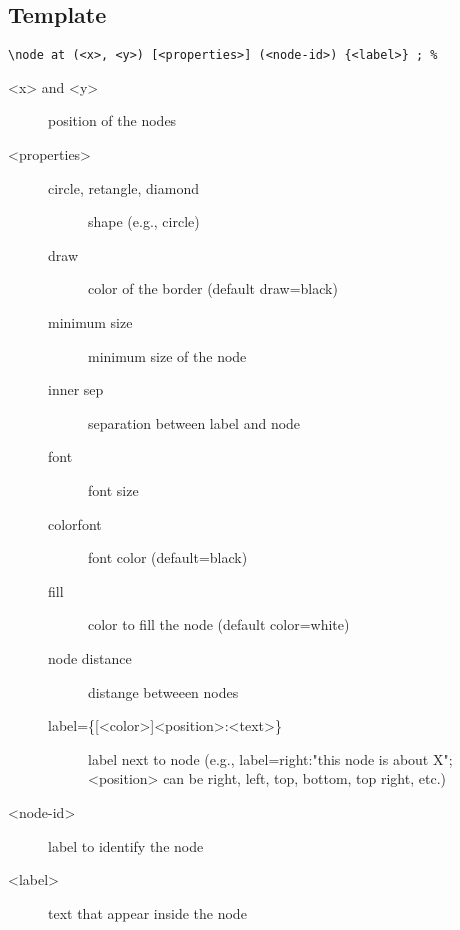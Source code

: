 \documentclass[a4paper]{article}
\begin{document}
\FloatBarrier
\clearpage

\subsection{Template}
\label{sec:org2ffc3e6}

\lstset{numbers=left,language=[LaTeX]TeX,label= ,caption= ,captionpos=b}
\begin{lstlisting}
\node at (<x>, <y>) [<properties>] (<node-id>) {<label>} ; %
\end{lstlisting}

\begin{description}
\item[{\color{red} <x> \color{black} and \color{red} <y> \color{black}}] position of the nodes
\item[{\color{red} <properties> \color{black}}] \begin{description}
\item[{circle, retangle, diamond}] shape (e.g., circle)
\item[{draw         }] color of the border (default draw=black)
\item[{minimum size }] minimum size of the node
\item[{inner sep    }] separation between label and node
\item[{font         }] font size
\item[{colorfont    }] font color (default=black)
\item[{fill         }] color to fill the node (default color=white)
\item[{node distance}] distange betweeen nodes
\item[{label=\{[<color>]<position>:\normalsize<text>\}        }] label next to node (e.g., label=right:"this node is about X"; <position> can be right, left, top, bottom, top right, etc.)
\end{description}
\item[{\color{red} <node-id> \color{black}}] label to identify the node
\item[{\color{red} <label> \color{black}}] text that appear inside the node
\end{description}
\end{document}

